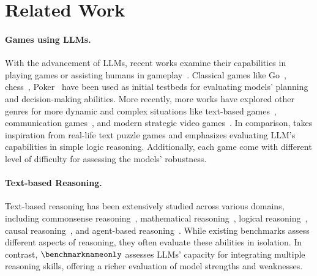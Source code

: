 \section{Related Work}
\paragraph{Games using LLMs.} With the advancement of LLMs, recent works examine their capabilities in playing games or assisting humans in gameplay~\cite{hu2024survey}. Classical games like Go~\cite{silver2017mastering}, chess~\cite{feng2024chessgpt}, Poker~\cite{huang2024pokergpt} have been used as initial testbeds for evaluating models' planning and decision-making abilities. More recently, more works have explored other genres for more dynamic and complex situations like text-based games~\cite{xiao2024llms, AGI-BY-2028, kazemi2024boardgameqa}, communication games~\cite{guan2025richelieu,xu2025learning}, and modern strategic video games~\cite{zhang2023creative,hu2024pok,qi2024civrealm,rao2024collaborative,ma2025large}. 
In comparison, \benchmarknameonly{} takes inspiration from real-life text puzzle games and emphasizes evaluating LLM's capabilities in simple logic reasoning. Additionally, each game come with different level of difficulty for assessing the models' robustness.

\paragraph{Text-based Reasoning.} Text-based reasoning has been extensively studied across various domains, including commonsense reasoning~\cite{rajani2019explain,bhargava2022commonsense,zhao2023large}, mathematical reasoning~\cite{patel2021nlp,zhao2022multihiertt,lu2023mathvista}, logical reasoning~\cite{pan2023logic}, causal reasoning~\cite{wang2024causalbench,jin2024cladder}, and agent-based reasoning~\cite{motwani2024malt}. While existing benchmarks assess different aspects of reasoning, they often evaluate these abilities in isolation. In contrast, $\benchmarknameonly$ assesses LLMs' capacity for integrating multiple reasoning skills, offering a richer evaluation of model strengths and weaknesses.
~